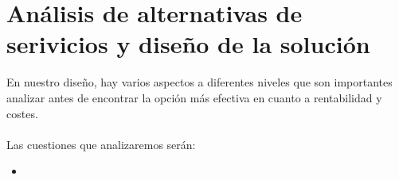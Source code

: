 \section{Análisis de alternativas de serivicios y diseño de la solución}
En nuestro diseño, hay varios aspectos a diferentes niveles que son importantes analizar antes de 
encontrar la opción más efectiva en cuanto a rentabilidad y costes. 
\paragraph{}
Las cuestiones que analizaremos serán: 
\begin{itemize}
    \item 
\end{itemize}